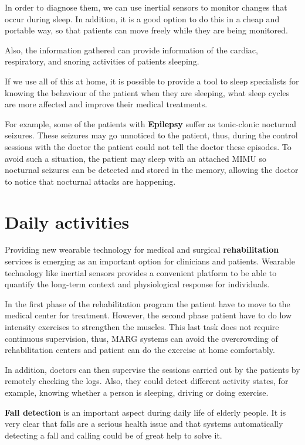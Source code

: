 In order to diagnose them, we can use inertial sensors to monitor changes that occur during sleep. In addition, it is a good option to do this in a cheap and portable way, so that patients can move freely while they are being monitored\cite{A.Olivares2013}.

Also, the information gathered can provide information of the cardiac, respiratory, and snoring activities of patients sleeping\cite{SanchezDaniel}.

If we use all of this at home, it is possible to provide a tool to sleep specialists for knowing the behaviour of the patient when they are sleeping, what sleep cycles are more affected and improve their medical  treatments. 

For example,  some of the patients with \textbf{Epilepsy} suffer as tonic-clonic nocturnal seizures. These seizures  may go unnoticed to the patient, thus, during the control sessions with the doctor the patient could not tell the doctor these episodes. To avoid such a situation, the patient may sleep with an attached MIMU so nocturnal seizures can be detected and stored in the memory, allowing the doctor to notice that nocturnal attacks are happening\cite{A.Olivares2013}. 

\section{Daily activities }
Providing new wearable technology for medical and surgical \textbf{rehabilitation} services is emerging as an important option for clinicians and patients. Wearable technology like inertial sensors provides a convenient platform to be able to quantify the long-term context and physiological response for  individuals\cite{Sung}.

In the first phase of the rehabilitation program the patient have to move to the medical center for treatment. However, the second phase patient have to do low intensity exercises to strengthen  the muscles. This last task does not require continuous  supervision, thus, MARG systems can avoid the overcrowding of rehabilitation centers and patient can do the exercise at home comfortably\cite{A.Olivares2013}.

In addition, doctors can then supervise the sessions carried out by the patients by remotely checking the logs. Also, they could detect different activity states, for example, knowing whether a person  is sleeping, driving or doing exercise\cite{A.Olivares2013}.

\textbf{Fall detection} is an important aspect during daily life of elderly people. It is very clear that falls are a serious health issue and that systems automatically detecting a fall and calling could be of great help to solve it. 

